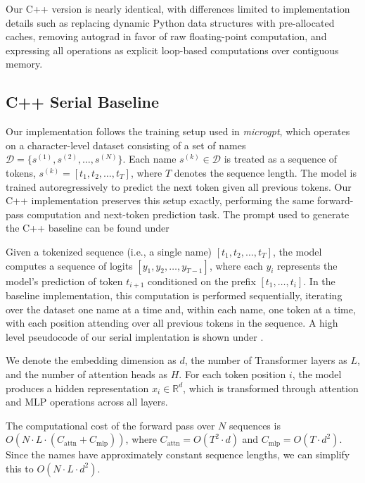 Our C++ version is nearly identical, with differences limited to implementation details such as replacing dynamic Python data structures with pre-allocated caches, removing autograd in favor of raw floating-point computation, and expressing all operations as explicit loop-based computations over contiguous memory.

\subsection*{C++ Serial Baseline}
Our implementation follows the training setup used in \textit{microgpt}, which operates on a character-level dataset consisting of a set of names $\mathcal{D} = \{s^{(1)}, s^{(2)}, \dots, s^{(N)}\}$. Each name $s^{(k)} \in \mathcal{D}$ is treated as a sequence of tokens, $s^{(k)} = [t_1, t_2, \dots, t_T]$, where $T$ denotes the sequence length. The model is trained autoregressively to predict the next token given all previous tokens. Our C++ implementation preserves this setup exactly, performing the same forward-pass computation and next-token prediction task. The prompt used to generate the 
C++ baseline can be found under 
 
Given a tokenized sequence (i.e., a single name) $[t_1, t_2, \dots, t_T]$, the model computes a sequence of logits $[y_1, y_2, \dots, y_{T-1}]$, where each $y_i$ represents the model's prediction of token $t_{i+1}$ conditioned on the prefix $[t_1, \dots, t_i]$. In the baseline implementation, this computation is performed sequentially, iterating over the dataset one name at a time and, within each name, one token at a time, with each position attending over all previous tokens in the sequence.  A high level pseudocode of our serial implentation is shown under .

We denote the embedding dimension as $d$, the number of Transformer layers as $L$, and the number of attention heads as $H$. For each token position $i$, the model produces a hidden representation $x_i \in \mathbb{R}^d$, which is transformed through attention and MLP operations across all layers. 

The computational cost of the forward pass over $N$ sequences is $O\!\left(N \cdot L \cdot (C_{\text{attn}} + C_{\text{mlp}})\right)$, where $C_{\text{attn}} = O(T^2 \cdot d)$ and $C_{\text{mlp}} = O(T \cdot d^2)$. Since the names have approximately constant sequence lengths, we can simplify this to $O(N \cdot L \cdot d^2)$. 


